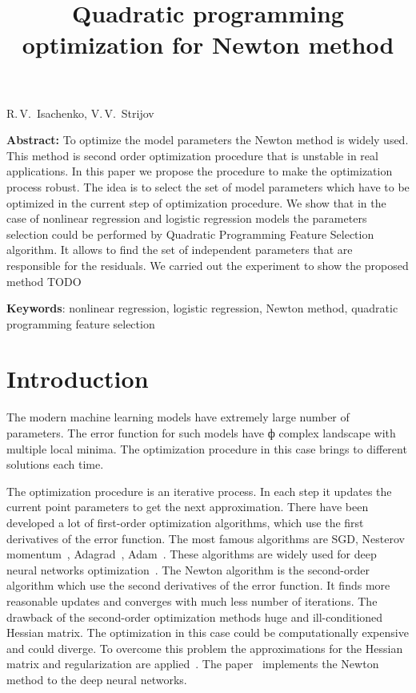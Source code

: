 \documentclass[a4paper,12pt]{article}
\theoremstyle{plain} %
\theoremstyle{definition} %
\theoremstyle{remark} %
\begin{document}
		
		\title
	{Quadratic programming optimization for Newton method}
	\date{}
	\maketitle
	\begin{center}
		R.\,V.~Isachenko,
		V.\,V.~Strijov
	\end{center}
	\textbf{Abstract:} 
	To optimize the model parameters the Newton method is widely used. 
	This method is second order optimization procedure that is unstable in real applications. 
	In this paper we propose the procedure to make the optimization process robust. 
	The idea is to select the set of model parameters which have to be optimized in the current step of optimization procedure.
	We show that in the case of nonlinear regression and logistic regression models the parameters selection could be performed by Quadratic Programming Feature Selection algorithm.
	It allows to find the set of independent parameters that are responsible for the residuals.
	We carried out the experiment to show the proposed method {\color{red} TODO}
	
	\bigskip
	\textbf{Keywords}: nonlinear regression, logistic regression, Newton method, quadratic programming feature selection
	
	\section*{Introduction}
	The modern machine learning models have extremely large number of parameters. 
	The error function for such models have ф complex landscape with multiple local minima. 
	The optimization procedure in this case brings to different solutions each time.
	
	The optimization procedure is an iterative process. 
	In each step it updates the current point parameters to get the next approximation.
	There have been developed a lot of first-order optimization algorithms, which use the first derivatives of the error function. 
	The most famous algorithms are SGD, Nesterov momentum~\cite{nesterov1983momentum}, Adagrad~\cite{duchi2011adagrad}, Adam~\cite{kingma2014adam}. 
	These algorithms are widely used for deep neural networks optimization~\cite{goodfellow2016deeplearningbook}. 
	The Newton algorithm is the second-order algorithm which use the second derivatives of the error function. 
	It finds more reasonable updates and converges with much less number of iterations.
	The drawback of the second-order optimization methods huge and ill-conditioned Hessian matrix. 
	The optimization in this case could be computationally expensive and could diverge. 
	To overcome this problem the approximations for the Hessian matrix and regularization are applied~\cite{avriel2003nonlinear,blaschke1997convergence}.
	The paper~\cite{botev2017newtondeeplearning} implements the Newton method to the deep neural networks.
	
\end{document}

